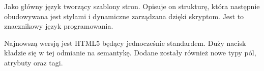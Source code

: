 Jako główny język tworzący szablony stron. Opisuje on strukturę, która następnie obudowywana jest stylami i dynamiczne zarządzana dzięki skryptom. Jest to znacznikowy język programowania.  

Najnowszą wersją jest HTML5 będący jednocześnie standardem. Duży nacisk kładzie się w tej odmianie na semantykę. Dodane zostały również nowe typy pól, atrybuty oraz tagi. 